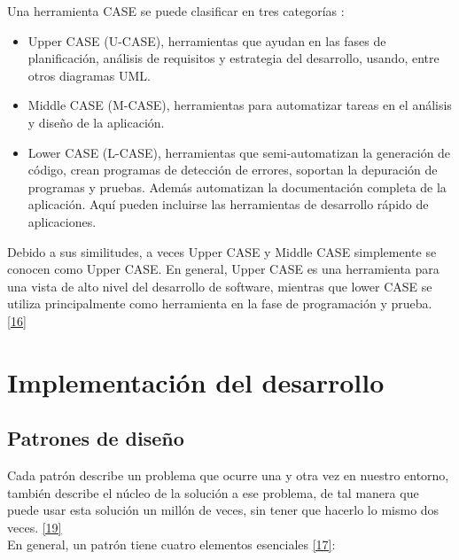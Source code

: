 Una herramienta CASE se puede clasificar en tres categorías  :

\begin{itemize}
	\item Upper CASE (U-CASE), herramientas que ayudan en las fases de planificación, análisis de requisitos y estrategia del desarrollo, usando, entre otros diagramas UML.
	\item Middle CASE (M-CASE), herramientas para automatizar tareas en el análisis y diseño de la aplicación.
	\item Lower CASE (L-CASE), herramientas que semi-automatizan la generación de código, crean programas de detección de errores, soportan la depuración de programas y pruebas. Además automatizan la documentación completa de la aplicación. Aquí pueden incluirse las herramientas de desarrollo rápido de aplicaciones.
\end{itemize}

Debido a sus similitudes, a veces Upper CASE y Middle CASE simplemente se conocen como Upper CASE. En general, Upper CASE es una herramienta para una vista de alto nivel del desarrollo de software, mientras que lower CASE se utiliza principalmente como herramienta en la fase de programación y prueba. \hyperlink{b16}{[16]}

\section {Implementación del desarrollo}

\subsection{Patrones de diseño}

Cada patrón describe un problema que ocurre una y otra vez en nuestro entorno, también describe el núcleo de la solución a ese problema, de tal manera que puede usar esta solución un millón de veces, sin tener que hacerlo lo mismo dos veces. \hyperlink{b19}{[19]} \\

En general, un patrón tiene cuatro elementos esenciales \hyperlink{b17}{[17]}:

